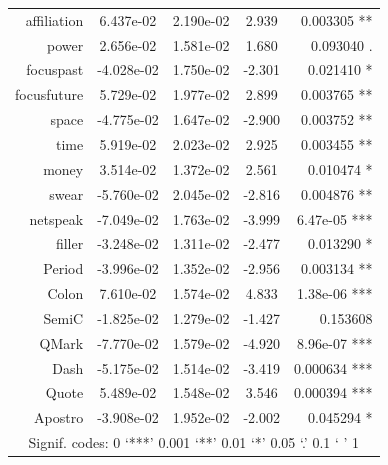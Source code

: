 \documentclass[bsc,frontabs,twoside,singlespacing,parskip,deptreport]{infthesis}
\begin{document}
\begin{table}[p]
{\begin{tabular}{rcccr}
affiliation & 6.437e-02  & 2.190e-02  & 2.939   & 0.003305 **                         \\
power       & 2.656e-02  & 1.581e-02  & 1.680   & 0.093040 .                          \\
focuspast   & -4.028e-02 & 1.750e-02  & -2.301  & 0.021410 *                          \\
focusfuture & 5.729e-02  & 1.977e-02  & 2.899   & 0.003765 **                         \\
space       & -4.775e-02 & 1.647e-02  & -2.900  & 0.003752 **                         \\
time        & 5.919e-02  & 2.023e-02  & 2.925   & 0.003455 **                         \\
money       & 3.514e-02  & 1.372e-02  & 2.561   & 0.010474 *                          \\
swear       & -5.760e-02 & 2.045e-02  & -2.816  & 0.004876 **                         \\
netspeak    & -7.049e-02 & 1.763e-02  & -3.999  & 6.47e-05 ***                        \\
filler      & -3.248e-02 & 1.311e-02  & -2.477  & 0.013290 *                          \\
Period      & -3.996e-02 & 1.352e-02  & -2.956  & 0.003134 **                         \\
Colon       & 7.610e-02  & 1.574e-02  & 4.833   & 1.38e-06 ***                        \\
SemiC       & -1.825e-02 & 1.279e-02  & -1.427  & 0.153608                            \\
QMark       & -7.770e-02 & 1.579e-02  & -4.920  & 8.96e-07 ***                        \\
Dash        & -5.175e-02 & 1.514e-02  & -3.419  & 0.000634 ***                        \\
Quote       & 5.489e-02  & 1.548e-02  & 3.546   & 0.000394 ***                        \\
Apostro     & -3.908e-02 & 1.952e-02  & -2.002  & 0.045294 *                          \\ \hline
\multicolumn{5}{c}{Signif. codes:  0 ‘***’ 0.001 ‘**’ 0.01 ‘*’ 0.05 ‘.’ 0.1 ‘ ’ 1}    \\ \hline
\end{tabular}%
}
\end{table}
\end{document}
